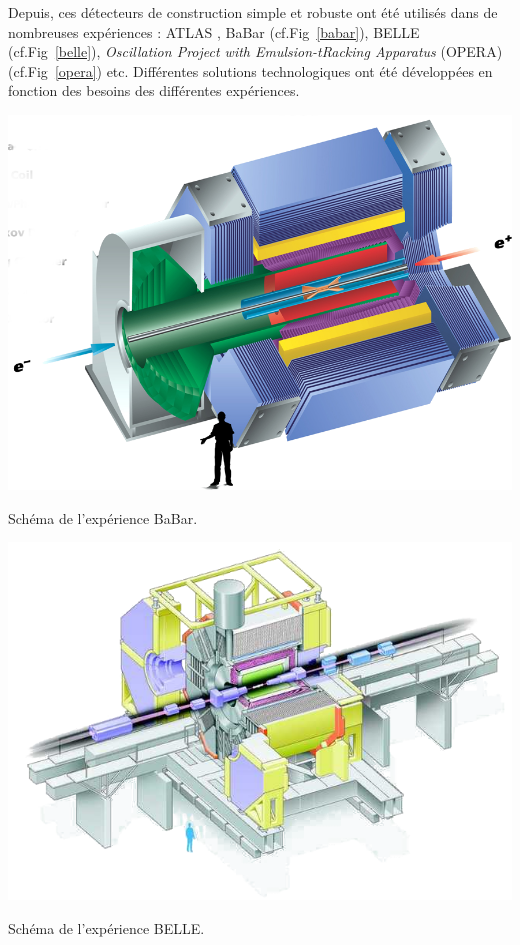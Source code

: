 Depuis, ces détecteurs de construction simple et robuste ont été utilisés dans de nombreuses expériences : ATLAS \cite{ATLAS}, BaBar \cite{Boutigny:1995ib} (cf.Fig~\ref{babar}), BELLE \cite{ABASHIAN2002117} (cf.Fig~\ref{belle}),  \textit{Oscillation Project with Emulsion-tRacking Apparatus} (OPERA) \cite{1748-0221-9-10-C10003} (cf.Fig~\ref{opera}) etc. Différentes solutions technologiques ont été développées en fonction des besoins des différentes expériences.

\marginpar
{
	\centering
	\includegraphics[width=\marginparwidth]{RPC/babar.png}
	\captionsetup{type=subfigure}\caption{Schéma de l'expérience BaBar.}
	\label{babar}
}

\marginpar
{
	\centering
	\includegraphics[width=\marginparwidth]{RPC/belle.png}
	\captionsetup{type=subfigure}\caption{Schéma de l'expérience BELLE.}
	\label{belle}
}

